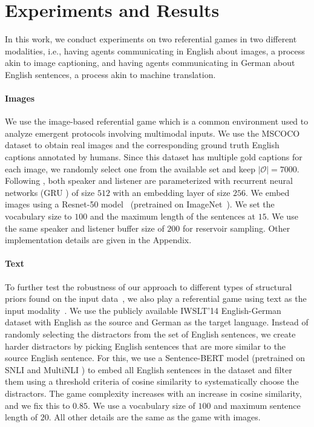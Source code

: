 \documentclass{article}
\begin{document}
\section{Experiments and Results}
\label{sec:exp-res}
In this work, we conduct experiments on two referential games in two different modalities, i.e., having agents communicating in English about images, a process akin to image captioning, and having agents communicating in German about English sentences, a process akin to machine translation.

\paragraph{Images}
We use the image-based referential game \citep{lee_emergent_2017,lazaridou_emergence_2018,lowe*2020on,lazaridou-etal-2020-multi} which is a common environment used to analyze emergent protocols involving multimodal inputs. We use the MSCOCO dataset \citep{Lin2014MicrosoftCC} to obtain real images and the corresponding ground truth English captions annotated by humans. Since this dataset has multiple gold captions for each image, we randomly select one from the available set and keep $|\mathcal{O}|=7000$. Following \citep{lee_countering_2019,lowe*2020on}, both speaker and listener are parameterized with recurrent neural networks (GRU \citep{cho-etal-2014-learning}) of size $512$ with an embedding layer of size $256$. We embed images using a Resnet-50 model~\citep{7780459} (pretrained on ImageNet~\citep{5206848}). We set the vocabulary size to $100$ and the maximum length of the sentences at $15$. We use the same speaker and listener buffer size of $200$ for reservoir sampling. Other implementation details are given in the Appendix.

\paragraph{Text}
To further test the robustness of our approach to different types of structural priors found on the input data~\citep{DBLP:journals/corr/abs-2002-01335}, we also play a referential game using text as the input modality~\citep{lee_countering_2019}. We use the publicly available IWSLT'14 English-German dataset with English as the source and German as the target language. Instead of randomly selecting the distractors from the set of English sentences, we create harder distractors by picking English sentences that are more similar to the source English sentence. For this, we use a Sentence-BERT model \citep{reimers-gurevych-2019-sentence} (pretrained on SNLI \citep{bowman-etal-2015-large} and MultiNLI \citep{williams-etal-2018-broad}) to embed all English sentences in the dataset and filter them using a threshold criteria of cosine similarity to systematically choose the distractors. The game complexity increases with an increase in cosine similarity, and we fix this to $0.85$. We use a vocabulary size of $100$ and maximum sentence length of $20$. All other details are the same as the game with images.
\end{document}
